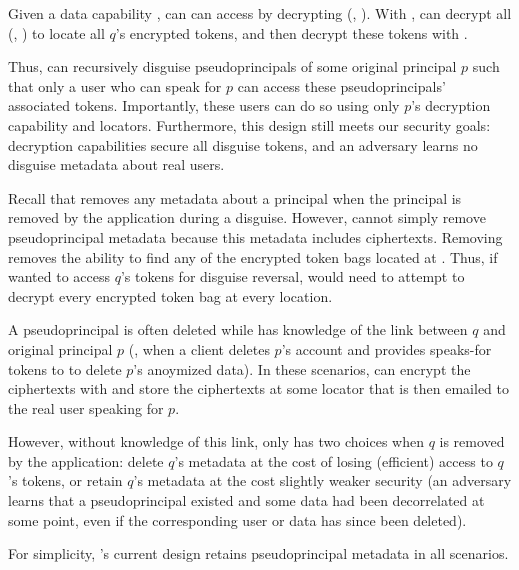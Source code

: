 Given a data capability , \sys can can access  by decrypting \enc(,
).
%
With , \sys can decrypt all \enc(, ) to locate all $q$'s encrypted
tokens, and then decrypt these tokens with . 

Thus, \sys can recursively disguise pseudoprincipals of some original principal $p$ such that only a
user who can speak for $p$ can access these pseudoprincipals' associated tokens.
Importantly, these users can do so using only $p$'s decryption capability and locators.
Furthermore, this design still meets our security goals: decryption capabilities secure all disguise
tokens, and an adversary learns no disguise metadata about real users.


Recall that \sys removes any metadata about a principal when the principal is removed by the
application during a disguise.
However, \sys cannot simply remove pseudoprincipal metadata because this metadata includes 
ciphertexts. Removing  removes the ability to find any of the encrypted token bags
located at . Thus, if \sys wanted to access $q$'s tokens for \eg disguise reversal, \sys
would need to attempt to decrypt every encrypted token bag at every location.

A pseudoprincipal is often deleted while \sys has knowledge of the link between $q$ and
original principal $p$ (\eg, when a client deletes $p$'s account and provides speaks-for tokens
to \sys to delete $p$'s anoymized data). In these scenarios, \sys can encrypt the
 ciphertexts with  and store the ciphertexts at some locator that is then emailed
to the real user speaking for $p$.

However, without knowledge of this link, \sys only has two choices when $q$ is removed by the
application: delete $q$'s metadata at the cost of losing (efficient) access to $q$'s tokens, or
retain $q$'s metadata at the cost slightly weaker security (an adversary learns that a
pseudoprincipal existed and some data had been decorrelated at some point, even if the corresponding
user or data has since been deleted).

For simplicity, \sys's current design retains pseudoprincipal metadata in all scenarios.

